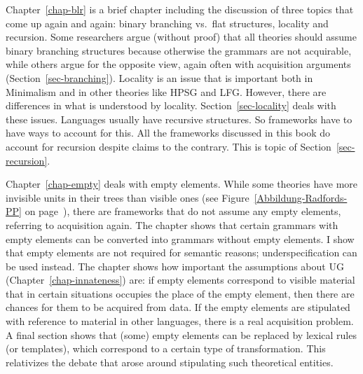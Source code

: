 \addlines
Chapter~\ref{chap-blr} is a brief chapter including the discussion of three topics that come up
again and again: binary branching vs.\ flat structures, locality and recursion. Some researchers
argue (without proof) that all theories should assume binary branching structures because otherwise
the grammars are not acquirable, while others argue for the opposite view, again often with acquisition
arguments (Section~\ref{sec-branching}). Locality is an issue that is important both in Minimalism and in other theories like HPSG
and LFG. However, there are differences in what is understood by
locality. Section~\ref{sec-locality} deals with these issues. Languages usually have recursive
structures. So frameworks have to have ways to account for this. All the frameworks discussed in
this book do account for recursion despite claims to the contrary. This is topic of
Section~\ref{sec-recursion}.

Chapter~\ref{chap-empty} deals with empty elements. While some theories have more invisible units
in their trees than visible ones (see Figure~\ref{Abbildung-Radfords-PP} on
page~\pageref{Abbildung-Radfords-PP}), there are frameworks that do not assume any empty elements,
referring to acquisition again. The chapter shows that certain grammars with empty elements can be
converted into grammars without empty elements. I show that empty elements are not required for
semantic reasons; underspecification can be used instead. The chapter shows how important the assumptions
about UG (Chapter~\ref{chap-innateness}) are: if empty elements correspond to visible material that
in certain situations occupies the place of the empty element, then there are chances for them to be
acquired from data. If the empty elements are stipulated with reference to material in other
languages, there is a real acquisition problem. A final section shows that (some) empty elements can
be replaced by lexical rules (or templates), which correspond to a certain type of
transformation. This relativizes the debate that arose around stipulating such theoretical entities.
 
